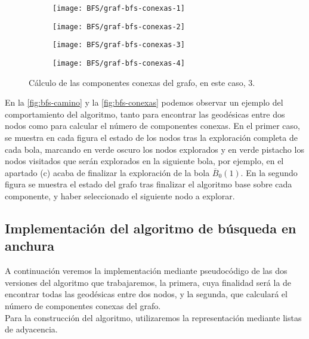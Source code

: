 \begin{figure}[!]
	\centering
	\begin{subfigure}{0.25\linewidth}
		\texttt{[image: BFS/graf-bfs-conexas-1]}
		\caption{}
	\end{subfigure}
	\begin{subfigure}{0.25\linewidth}
		\texttt{[image: BFS/graf-bfs-conexas-2]}
		\caption{}
	\end{subfigure}
	\begin{subfigure}{0.25\linewidth}
		\texttt{[image: BFS/graf-bfs-conexas-3]}
		\caption{}
	\end{subfigure}
	\begin{subfigure}{0.25\linewidth}
		\texttt{[image: BFS/graf-bfs-conexas-4]}
		\caption{}
	\end{subfigure}
	\caption{Cálculo de las componentes conexas del grafo, en este caso, 3.}
	\label{fig:bfs-conexas}
\end{figure}

En la \autoref{fig:bfs-camino} y la \autoref{fig:bfs-conexas} podemos observar un ejemplo del comportamiento del algoritmo, tanto para encontrar las geodésicas entre dos nodos como para calcular el número de componentes conexas. En el primer caso, se muestra en cada figura el estado de los nodos tras la exploración completa de cada bola, marcando en verde oscuro los nodos explorados y en verde pistacho los nodos visitados que serán explorados en la siguiente bola, por ejemplo, en el apartado (c) acaba de finalizar la exploración de la bola $\overline B_0(1)$. En la segundo figura se muestra el estado del grafo tras finalizar el algoritmo base sobre cada componente, y haber seleccionado el siguiente nodo a explorar.


\subsection{Implementación del algoritmo de búsqueda en anchura}
A continuación veremos la implementación mediante pseudocódigo de las dos versiones del algoritmo que trabajaremos, la primera, cuya finalidad será la de encontrar todas las geodésicas entre dos nodos, y la segunda, que calculará el número de componentes conexas del grafo. \\

Para la construcción del algoritmo, utilizaremos la representación mediante listas de adyacencia. \\

